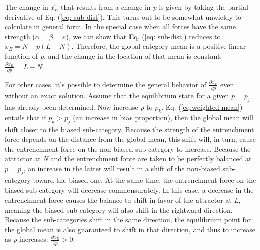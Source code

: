 The change in $\overline{x_{E}}$ that results from a change in \emph{p}
is given by taking the partial derivative of Eq. (\ref{eq: sub-dist}).
This turns out to be somewhat unwieldy to calculate in general form.
In the special case when all forces have the same strength ($\alpha=\beta=\varepsilon$),
we can show that Eq. (\ref{eq: sub-dist}) reduces to $\overline{x_{E}}=N+p(L-N)$.
Therefore, the global category mean is a positive linear function
of \emph{p}, and the change in the location of that mean is constant:
$\frac{\partial\overline{x_{E}}}{\partial p}=L-N$. 

For other cases, it's possible to determine the general behavior of
$\frac{\partial\overline{x_{E}}}{\partial p}$ even without an exact
solution. Assume that the equilibrium state for a given $p=p_{j}$
has already been determined. Now increase \emph{p} to $p_{k}$. Eq.
(\ref{eq:weighted mean}) entails that if $p_{k}>p_{j}$ (an increase
in bias proportion), then the global mean will shift closer to the
biased sub-category. Because the strength of the entrenchment force
depends on the distance from the global mean, this shift will, in
turn, cause the entrenchment force on the non-biased sub-category
to increase. Because the attractor at \emph{N} and the entrenchment
force are taken to be perfectly balanced at $p=p_{j}$, an increase
in the latter will result in a shift of the non-biased sub-category
toward the biased one. At the same time, the entrenchment force on
the biased sub-category will decrease commensurately. In this case,
a decrease in the entrenchment force causes the balance to shift in
favor of the attractor at \emph{L}, meaning the biased sub-category
will also shift in the rightward direction. Because the sub-categories
shift in the same direction, the equilibrium point for the global
mean is also guaranteed to shift in that direction, and thus to increase
as \emph{p} increases: $\frac{\partial\overline{x_{E}}}{\partial p}>0$. 

